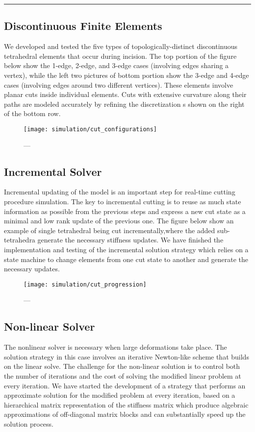 \hrule%

\subsection{Discontinuous Finite Elements}\label{ssec:discontinuous_fem}
We developed and tested the five types of topologically-distinct discontinuous tetrahedral elements that occur during incision. The top portion of the figure below show the 1-edge, 2-edge, and 3-edge cases (involving edges sharing a vertex), while the left two pictures of bottom portion show the 3-edge and 4-edge cases (involving edges around two different vertices). These elements involve planar cuts inside individual elements. Cuts with extensive curvature along their paths are modeled accurately by refining the discretization s shown on the right of the bottom row.

\begin{figure}
  \centering%
  \texttt{[image: simulation/cut\_configurations]}
  \caption{---}\label{fig:discontinuous_tetrahedra_fem}
\end{figure}

\subsection{Incremental Solver}\label{ssec:incremental_solver}
Incremental updating of the model is an important step for real-time cutting procedure simulation. The key to incremental cutting is to reuse as much state information as possible from the previous steps and express a new cut state as a minimal and low rank update of the previous one. The figure below show an example of single tetrahedral being cut incrementally,where the added sub-tetrahedra generate the necessary stiffness updates. We have finished the implementation and testing of the incremental solution strategy which relies on a state machine to change elements from one cut state to another and generate the necessary updates.

\begin{figure}
  \centering%
  \texttt{[image: simulation/cut\_progression]}
  \caption{---}\label{fig:discontinuous_tetrahedra_solver}
\end{figure}

\subsection{Non-linear Solver}\label{ssec:nonlinear_solver}
The nonlinear solver is necessary when large deformations take place. The solution strategy in this case involves an iterative Newton-like scheme that builds on the linear solve. The challenge for the non-linear solution is to control both the number of iterations and the cost of solving the modified linear problem at every iteration. We have started the development of a strategy that performs an approximate solution for the modified problem at every iteration, based on a hierarchical matrix representation of the stiffness matrix which produce algebraic approximations of off-diagonal matrix blocks and can substantially speed up the solution process.

